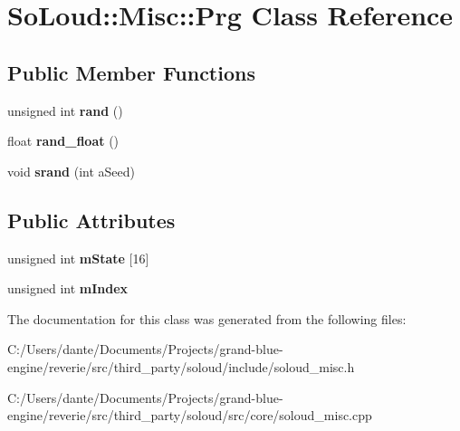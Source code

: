 \hypertarget{class_so_loud_1_1_misc_1_1_prg}{}\section{So\+Loud\+::Misc\+::Prg Class Reference}
\label{class_so_loud_1_1_misc_1_1_prg}
\subsection*{Public Member Functions}
\begin{DoxyCompactItemize}
\item 
\mbox{\label{class_so_loud_1_1_misc_1_1_prg_a9f36df89992df79ced1a122813d59186}} 
unsigned int {\bfseries rand} ()
\item 
\mbox{\label{class_so_loud_1_1_misc_1_1_prg_a9fe98015890ee85e8699d8b6b5c86d8d}} 
float {\bfseries rand\+\_\+float} ()
\item 
\mbox{\label{class_so_loud_1_1_misc_1_1_prg_a6148b7700be63f5e1dc1aa251de3cd8a}} 
void {\bfseries srand} (int a\+Seed)
\end{DoxyCompactItemize}
\subsection*{Public Attributes}
\begin{DoxyCompactItemize}
\item 
\mbox{\label{class_so_loud_1_1_misc_1_1_prg_adce2d48ab4b6614c32bc3b1930672eaa}} 
unsigned int {\bfseries m\+State} \mbox{[}16\mbox{]}
\item 
\mbox{\label{class_so_loud_1_1_misc_1_1_prg_a10deba905742b6d335254a83d93497b5}} 
unsigned int {\bfseries m\+Index}
\end{DoxyCompactItemize}


The documentation for this class was generated from the following files\+:\begin{DoxyCompactItemize}
\item 
C\+:/\+Users/dante/\+Documents/\+Projects/grand-\/blue-\/engine/reverie/src/third\+\_\+party/soloud/include/soloud\+\_\+misc.\+h\item 
C\+:/\+Users/dante/\+Documents/\+Projects/grand-\/blue-\/engine/reverie/src/third\+\_\+party/soloud/src/core/soloud\+\_\+misc.\+cpp\end{DoxyCompactItemize}
